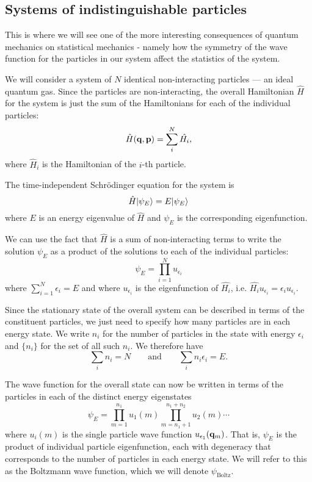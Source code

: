 \subsection{Systems of indistinguishable particles}
This is where we will see one of the more interesting consequences of quantum mechanics on statistical mechanics - namely how the symmetry of the wave function for the particles in our system affect the statistics of the system.

We will consider a system of $N$ identical non-interacting particles --- an ideal quantum gas. Since the particles are non-interacting, the overall Hamiltonian $\hat{H}$ for the system is just the sum of the Hamiltonians for each of the individual particles:
$$
	\hat{H}({\bf q},{\bf p}) = \sum_i^N\hat{H_i},
$$
where $\hat{H}_i$ is the Hamiltonian of the $i$-th particle.

The time-independent Schr\"odinger equation for the system is
$$
	\hat{H}| \psi_E \rangle = E| \psi_E \rangle
$$
where $E$ is an energy eigenvalue of $\hat{H}$ and $\psi_E$ is the corresponding eigenfunction.

We can use the fact that $\hat{H}$ is a sum of non-interacting terms to write the solution $\psi_E$ as a product of the solutions to each of the individual particles: 
$$
	\psi_E = \prod_{i=1}^Nu_{\epsilon_i}
$$
where $\sum_{i=1}^N\epsilon_i = E$ and where $u_{\epsilon_i}$ is the eigenfunction of $\hat{H_i}$, i.e. $\hat{H_i}u_{\epsilon_i}={\epsilon_i}u_{\epsilon_i}$.

Since the stationary state of the overall system can be described in terms of the constituent particles, we just need to specify how many particles are in each energy state. We write $n_i$ for the number of particles in the state with energy $\epsilon_i$ and $\{n_i\}$ for the set of all such $n_i$. We therefore have
$$
	\sum_i n_i =N \qquad \text{and} \qquad \sum_in_i\epsilon_i = E.
$$

The wave function for the overall state can now be written in terms of the particles in each of the distinct energy eigenstates
\begin{equation}
	\psi_E = \prod_{m=1}^{n_1}u_1(m)\prod_{m=n_1+1}^{n_1+n_2}u_2(m)\cdots
	\label{eq:compfn}
\end{equation}
where $u_i(m)$ is the single particle wave function $u_{\epsilon_1}({\bf q}_m)$.
That is, $\psi_E$ is the product of individual particle eigenfunction, each with degeneracy that corresponds to the number of particles in each energy state.
We will refer to this as the Boltzmann wave function, which we will denote $\psi_\text{Boltz}$.

